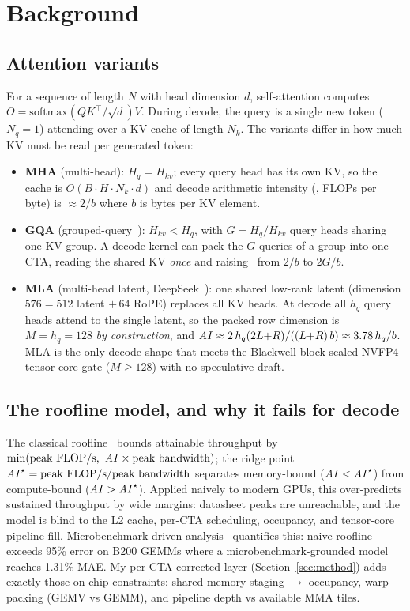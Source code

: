\section{Background}
\label{sec:background}

\subsection{Attention variants}
For a sequence of length $N$ with head dimension $d$, self-attention computes
$O = \mathrm{softmax}(QK^\top/\sqrt{d})V$. During decode, the query is a single
new token ($N_q{=}1$) attending over a KV cache of length $N_k$. The variants
differ in how much KV must be read per generated token:
\begin{itemize}
  \item \textbf{MHA} (multi-head): $H_q{=}H_{kv}$; every query head has its own KV,
  so the cache is $O(B \cdot H \cdot N_k \cdot d)$ and decode arithmetic intensity
  (\ai, FLOPs per byte) is $\approx 2/b$ where $b$ is bytes per KV element.
  \item \textbf{GQA} (grouped-query~\cite{gqa}): $H_{kv} < H_q$, with
  $G{=}H_q/H_{kv}$ query heads sharing one KV group. A decode kernel can pack the
  $G$ queries of a group into one CTA, reading the shared KV \emph{once} and
  raising \ai\ from $2/b$ to $2G/b$.
  \item \textbf{MLA} (multi-head latent, DeepSeek~\cite{deepseekv2,deepseekv3}):
  one shared low-rank latent (dimension $576 = 512$ latent $+\,64$ RoPE) replaces
  all KV heads. At decode all $h_q$ query heads attend to the single latent, so
  the packed row dimension is $M{=}h_q{=}128$ \emph{by construction}, and
  $\mathit{AI} \approx 2\,h_q(2L{+}R)/((L{+}R)\,b) \approx 3.78\,h_q/b$. MLA is the only
  decode shape that meets the Blackwell block-scaled NVFP4 tensor-core gate
  ($M \ge 128$) with no speculative draft.
\end{itemize}

\subsection{The roofline model, and why it fails for decode}
The classical roofline~\cite{roofline} bounds attainable throughput by
$\min(\text{peak FLOP/s},\ \mathit{AI} \times \text{peak bandwidth})$; the ridge point
$\mathit{AI}^\star = \text{peak FLOP/s} / \text{peak bandwidth}$ separates memory-bound
($\mathit{AI} < \mathit{AI}^\star$) from compute-bound ($\mathit{AI} > \mathit{AI}^\star$). Applied naively to
modern GPUs, this over-predicts sustained throughput by wide margins: datasheet
peaks are unreachable, and the model is blind to the L2 cache, per-CTA
scheduling, occupancy, and tensor-core pipeline fill. Microbenchmark-driven
analysis~\cite{roofmethod} quantifies this: naive roofline exceeds 95\% error on
B200 GEMMs where a microbenchmark-grounded model reaches 1.31\% MAE. My
per-CTA-corrected layer (Section~\ref{sec:method}) adds exactly those on-chip
constraints: shared-memory staging $\to$ occupancy, warp packing (GEMV vs GEMM),
and pipeline depth vs available MMA tiles.

